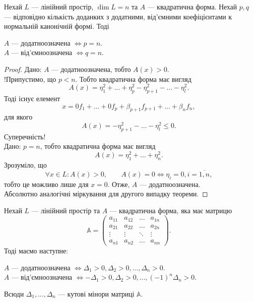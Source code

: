 \documentclass{math_library}
\begin{document}
\begin{theorem}
Нехай $L$ --- лінійний простір, $\dim L = n$ та $A$ --- квадратична форма. Нехай $p,q$ --- відповідно кількість доданких з додатними, від'ємними коефіцієнтами к нормальній канонічній формі. Тоді
\begin{center}
$A$ --- додатноозначена $\iff p = n$.\\
$A$ --- від'ємноозначена $\iff q = n$.
\end{center}
\end{theorem}

\begin{proof}
\rightproof Дано: $A$ --- додатноозначена, тобто $A(x) > 0$.\\
!Припустимо, що $p < n$. Тобто квадратична форма має вигляд 
\[
A(x) = \eta_1^2 + \dots + \eta_p^2 - \eta_{p+1}^2 - \dots - \eta_l^2.
\]
Тоді існує елемент 
\[
x = 0f_1 + \dots + 0f_p + \beta_{p+1}f_{p+1} + \dots + \beta_n f_n,
\]
для якого 
\[
A(x) = -\eta_{p+1}^2 - \dots - \eta_l^2 \leq 0.
\]
Суперечність!
\bigskip \\
\leftproof Дано: $p = n$, тобто квадратична форма має вигляд 
\[
A(x) = \eta_1^2 + \dots + \eta_n^2.
\]
Зрозуміло, що 
\[
\forall x \in L: A(x) > 0, \qquad A(x) = 0 \iff \eta_i = 0, i = \overline{1,n},
\]
тобто це можливо лише для $x = 0$. Отже, $A$ --- додатноозначена.
\bigskip \\
Абсолютно аналогічні міркування для другого випадку теореми.
\end{proof}

\begin{theorem}
Нехай $L$ --- лінійний простір та $A$ --- квадратична форма, яка має матрицю 
\[
\mathbb{A} = \begin{pmatrix}
a_{11} & a_{12} & \dots & a_{1n} \\
a_{21} & a_{22} & \dots & a_{2n} \\
\vdots & \vdots & \ddots & \vdots \\
a_{n1} & a_{n2} & \dots & a_{nn}
\end{pmatrix}.
\]
Тоді маємо наступне:
\begin{center}
$A$ --- додатноозначена $\iff \Delta_1 > 0, \Delta_2 > 0, \dots, \Delta_n > 0$.\\
$A$ --- від'ємноозначена $\iff -\Delta_1 > 0, \Delta_2 > 0, \dots, (-1)^n\Delta_n > 0$.
\end{center}
Всюди $\Delta_1,\dots,\Delta_n$ --- кутові мінори матриці $\mathbb{A}$.
\end{theorem}
\end{document}
